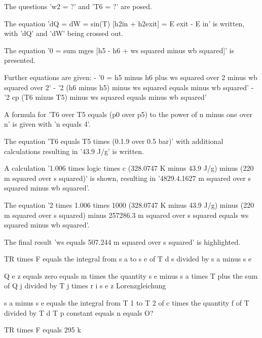The questions 'w2 = ?' and 'T6 = ?' are posed.

The equation 'dQ = dW = sin(T) [h2in + h2exit] = E exit - E in' is written, with 'dQ' and 'dW' being crossed out.

The equation '0 = sum mges [h5 - h6 + ws squared minus wb squared]' is presented.

Further equations are given:
- '0 = h5 minus h6 plus ws squared over 2 minus wb squared over 2'
- '2 (h6 minus h5) minus ws squared equals minus wb squared'
- '2 cp (T6 minus T5) minus ws squared equals minus wb squared'

A formula for 'T6 over T5 equals (p0 over p5) to the power of n minus one over n' is given with 'n equals 4'.

The equation 'T6 equals T5 times (0.1.9 over 0.5 bar)' with additional calculations resulting in '43.9 J/g' is written.

A calculation '1.006 times logic times c (328.0747 K minus 43.9 J/g) minus (220 m squared over s squared)' is shown, resulting in '4829.4.1627 m squared over s squared minus wb squared'.

The equation '2 times 1.006 times 1000 (328.0747 K minus 43.9 J/g) minus (220 m squared over s squared) minus 257286.3 m squared over s squared equals ws squared minus wb squared'.

The final result 'ws equals 507.244 m squared over s squared' is highlighted.

TR times F equals the integral from s a to s e of T d s divided by s a minus s e  

Q e z equals zero equals m times the quantity s e minus s a times T plus the sum of Q j divided by T j times r i s e z  
Lorenzgleichung  

s a minus s e equals the integral from T 1 to T 2 of c times the quantity f of T divided by T d T  
p constant equals n equals O?  

TR times F equals 295 k